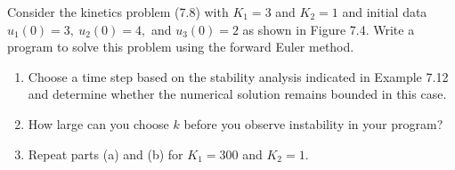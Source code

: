 

Consider the kinetics problem (7.8) with $K_1=3$ and $K_2=1$ and initial
data $u_1(0)=3,~u_2(0)=4,$ and $u_3(0)=2$ as shown in Figure 7.4.  Write a
program to solve this problem using the forward Euler method.  

\begin{enumerate} 
\item Choose a time
step based on the stability analysis indicated in Example 7.12 and determine
whether the numerical solution remains bounded in this case.  

\item How large can you choose $k$ before you observe instability in your
program?

\item Repeat parts (a) and (b) for $K_1=300$ and $K_2=1$.

\end{enumerate}

